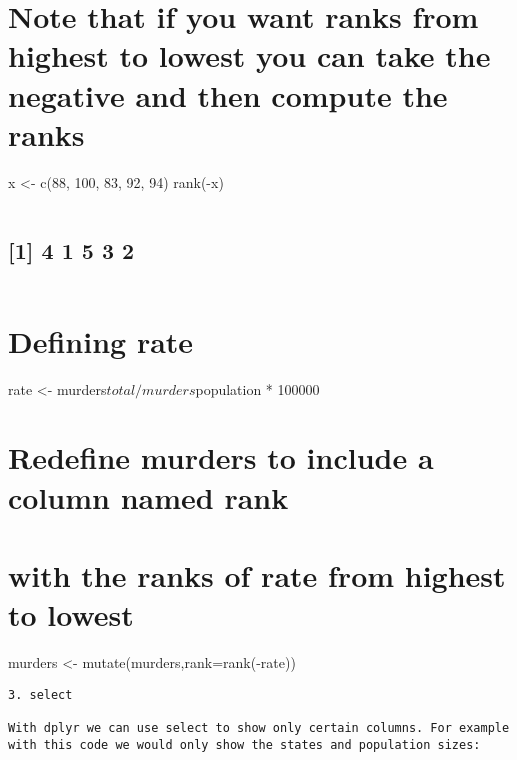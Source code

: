 \documentclass[
]{article}
\begin{document}
\hypertarget{note-that-if-you-want-ranks-from-highest-to-lowest-you-can-take-the-negative-and-then-compute-the-ranks}{%
\section{Note that if you want ranks from highest to lowest you can take
the negative and then compute the
ranks}\label{note-that-if-you-want-ranks-from-highest-to-lowest-you-can-take-the-negative-and-then-compute-the-ranks}}

x \textless- c(88, 100, 83, 92, 94) rank(-x)

\begin{verbatim}
\end{verbatim}

\hypertarget{section}{%
\subsection{{[}1{]} 4 1 5 3 2}\label{section}}

\begin{verbatim}
\end{verbatim}

\hypertarget{defining-rate}{%
\section{Defining rate}\label{defining-rate}}

rate \textless- murders\(total/ murders\)population * 100000

\hypertarget{redefine-murders-to-include-a-column-named-rank}{%
\section{Redefine murders to include a column named
rank}\label{redefine-murders-to-include-a-column-named-rank}}

\hypertarget{with-the-ranks-of-rate-from-highest-to-lowest}{%
\section{with the ranks of rate from highest to
lowest}\label{with-the-ranks-of-rate-from-highest-to-lowest}}

murders \textless- mutate(murders,rank=rank(-rate))

\begin{verbatim}
3. select

With dplyr we can use select to show only certain columns. For example with this code we would only show the states and population sizes:
\end{verbatim}
\end{document}
